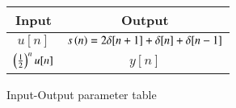\centering
\begin{tabular}{|c|c|}
        \hline
        \textbf{Input} & \textbf{Output} \\
        \hline
        $u[n]$ & $s\left(n\right)=2\delta[n+1]+\delta[n]+\delta[n-1]$ \\ 
	\hline
	$\left(\frac{1}{2}\right)^nu[n]$ & $y[n]$  \\ 
        \hline
\end{tabular}
\caption{Input-Output parameter table}
\label{tab:gate.2023.ec.40.1}




